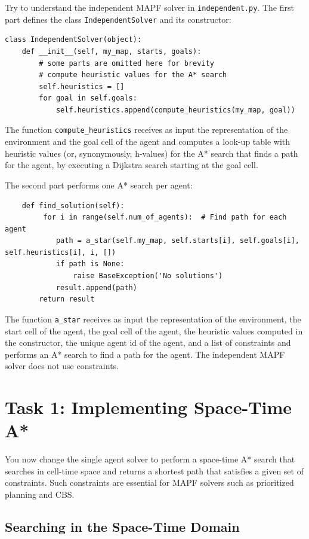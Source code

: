\documentclass[11pt]{article}
\begin{document}
Try to understand the independent MAPF solver in \texttt{independent.py}. The first part defines the class \texttt{IndependentSolver} and its constructor:

\begin{verbatim}
class IndependentSolver(object):
    def __init__(self, my_map, starts, goals):
        # some parts are omitted here for brevity
        # compute heuristic values for the A* search
        self.heuristics = []
        for goal in self.goals:
            self.heuristics.append(compute_heuristics(my_map, goal))
\end{verbatim}

The function \texttt{compute_heuristics} receives as input the representation of the environment and the goal cell of the agent and computes a look-up table with heuristic values (or, synonymously, h-values) for the A* search that finds a path for the agent, by executing a Dijkstra search starting at the goal cell.

The second part performs one A* search per agent:

\begin{verbatim}
    def find_solution(self):
         for i in range(self.num_of_agents):  # Find path for each agent
            path = a_star(self.my_map, self.starts[i], self.goals[i], self.heuristics[i], i, [])
            if path is None:
                raise BaseException('No solutions')
            result.append(path)
        return result
\end{verbatim}

The function \texttt{a_star} receives as input the representation of the environment, the start cell of the agent, the goal cell of the agent, the heuristic values computed in the constructor, the unique agent id of the agent, and a list of constraints and performs an A* search to find a path for the agent. The independent MAPF solver does not use constraints. 

\section{Task 1: Implementing Space-Time A*}

You now change the single agent solver to perform a space-time A* search that searches in cell-time space and returns a shortest path that satisfies a given set of constraints. Such constraints are essential for MAPF solvers such as prioritized planning and CBS.

\subsection{Searching in the Space-Time Domain}
\end{document}
